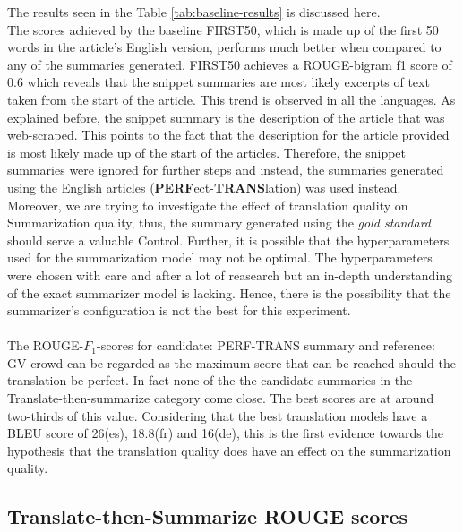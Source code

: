\documentclass[12pt,a4paper,twoside,openright]{report}
\newcommand{\fone}{$F_1$}
\begin{document}
The results seen in the Table \ref{tab:baseline-results} is discussed here. \\
The scores achieved by the baseline FIRST50, which is made up of the first 50 words in the article's English version, performs much better when compared to any of the summaries generated. FIRST50 achieves a ROUGE-bigram f1 score of 0.6 which reveals that the snippet summaries are most likely excerpts of text taken from the start of the article. This trend is observed in all the languages. As explained before, the snippet summary is the description of the article that was web-scraped. This points to the fact that the description for the article provided is most likely made up of the start of the articles. Therefore, the snippet summaries were ignored for further steps and instead, the summaries generated using the English articles (\textbf{PERF}{ect}-\textbf{TRANS}{lation}) was used instead. Moreover, we are trying to investigate the effect of translation quality on Summarization quality, thus, the summary generated using the \textit{gold standard} should serve a valuable Control. Further, it is possible that the hyperparameters used for the summarization model may not be optimal. The hyperparameters were chosen with care and after a lot of reasearch but an in-depth understanding of the exact summarizer model is lacking. Hence, there is the possibility that the summarizer's configuration is not the best for this experiment.
\\\\
The ROUGE-\fone-scores for candidate: PERF-TRANS summary and reference: GV-crowd can be regarded as the maximum score that can be reached should the translation be perfect. In fact none of the the candidate summaries in the Translate-then-summarize category come close. The best scores are at around two-thirds of this value. Considering that the best translation models have a BLEU score of 26(es), 18.8(fr) and 16(de), this is the first evidence towards the hypothesis that the translation quality does have an effect on the summarization quality.


\subsection{Translate-then-Summarize ROUGE scores}
\end{document}
